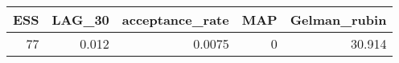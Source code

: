 \begin{longtable}{rrrrr}
\toprule
ESS & LAG\_30 & acceptance\_rate & MAP & Gelman\_rubin \\ 
\midrule
77 & 0.012 & 0.0075 & 0 & 30.914 \\ 
\bottomrule
\end{longtable}


